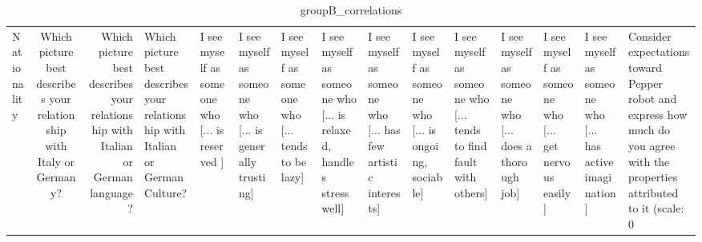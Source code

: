 \begin{table}
\caption{groupB_correlations}
\label{tab:groupB_correlations}
\begin{tabular}{lcr}
\toprule
Nationality & Which picture best describes your relationship with Italy or Germany? & Which picture best describes your relationship with Italian or German language? & Which picture best describes your relationship with Italian or German Culture? & I see myself as someone who  [... is reserved ] & I see myself as someone who  [... is generally trusting] & I see myself as someone who  [... tends to be lazy] & I see myself as someone who  [... is relaxed, handles stress well] & I see myself as someone who  [... has few artistic interests] & I see myself as someone who  [... is ongoing, sociable] & I see myself as someone who  [... tends to find fault with others] & I see myself as someone who  [... does a thorough job] & I see myself as someone who  [... get nervous easily] & I see myself as someone who  [... has active imagination] & Consider expectations toward Pepper robot and express how much do you agree with the properties attributed to it (scale: 0%
\end{tabular}
\end{table}
